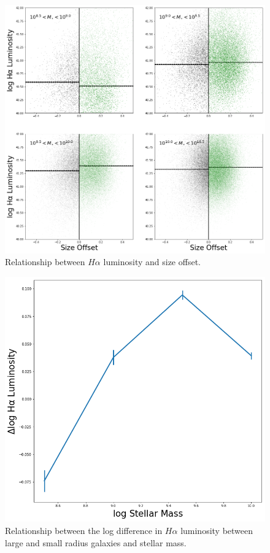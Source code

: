 \documentclass[iop]{emulateapj}
\begin{document}
\begin{figure}
	\centering
	\includegraphics[width=1.5 \columnwidth]{ha_lum_2x2.png}
	\caption{Relationship between $H\alpha$ luminosity and size offset. }
     \label{fig:HA_lum}

\end{figure}

\begin{figure}
	\centering
	\includegraphics[width= \columnwidth]{ratios_ha_lum.png}
	\caption{Relationship between the log difference in $H\alpha$ luminosity between large and small radius galaxies and stellar mass. }
	\label{fig:HA_lum_mass}
	
\end{figure}
\end{document}
